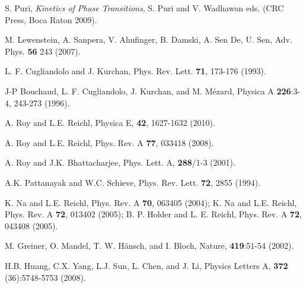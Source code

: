 \documentclass[a4paper,11pt,color]{article}
\renewenvironment{thebibliography}[1]{%
    \begin{oldthebibliography}{#1}%
      \setlength{\parskip}{0ex}%
      \setlength{\itemsep}{0ex}%
  }%
  {%
    \end{oldthebibliography}%
  }
\begin{document}
\begin{thebibliography}{}
S. Puri, \textit{Kinetics of Phase Transitions}, S. Puri and V. Wadhawan eds. (CRC Press, Boca Raton 2009).

M. Lewenstein, A. Sanpera, V. Ahufinger, B. Damski, A. Sen De, U. Sen, Adv. Phys. {\bf 56}
243 (2007).

L. F. Cugliandolo and J. Kurchan,  Phys. Rev. Lett. {\bf 71}, 173-176 (1993).

J-P Bouchaud, L. F. Cugliandolo, J. Kurchan, and M. M\'ezard, Physica A {\bf 226}:3-4, 243-273 (1996).





A. Roy and L.E. Reichl,  Physica {E}, {\bf 42}, 1627-1632 (2010). 

A. Roy and L.E. Reichl,  Phys. Rev. {A} {\bf 77}, 033418 (2008).

A. Roy and J.K. Bhattacharjee, Phys. Lett. {A}, {\bf 288}/1-3 (2001).

A.K. Pattanayak and W.C. Schieve, Phys. Rev. Lett. {\bf 72}, 2855 (1994).

K. Na and L.E. Reichl, Phys. Rev. A {\bf 70}, 063405 (2004); K. Na and L.E. Reichl, Phys. Rev. A {\bf 72}, 013402 (2005); B. P. Holder and L. E. Reichl, Phys. Rev. A {\bf 72}, 043408 (2005).

M. Greiner, O. Mandel, T. W. H\"ansch, and I. Bloch, Nature, {\bf 419}:51-54 (2002).

H.B. Huang, C.X. Yang, L.J. Sun, L. Chen, and J. Li, Physics Letters A, {\bf 372} (36):5748-5753 (2008).



\end{thebibliography}
\end{document}
